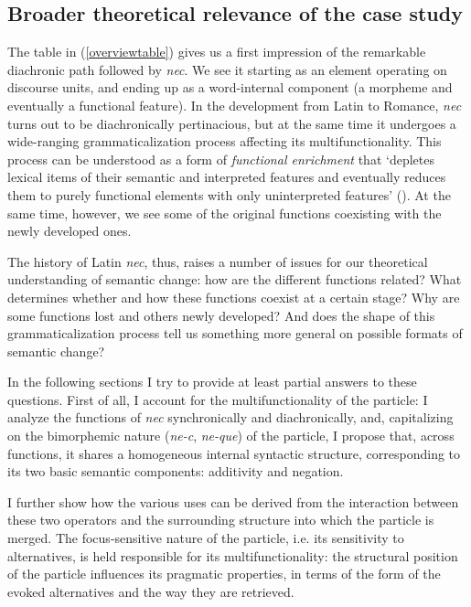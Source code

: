 \documentclass[output=paper,modfonts,nonflat,citecolor=brown,
showindex
]{langsci/langscibook}
\begin{document}
\subsection{Broader theoretical relevance of the case study} \label{theoreticalrelevance}

The table in (\ref{overviewtable}) gives us a first impression of the remarkable diachronic path followed by {\emph{nec}}. We see it starting as an element operating on discourse units, and ending up as a word-internal component (a morpheme and eventually a functional feature). In the development from Latin to Romance, {\emph{nec}} turns out to be diachronically pertinacious, but at the same time it undergoes a wide-ranging grammaticalization process affecting its multifunctionality. This process can be understood as a form of {\emph{functional enrichment}} that `depletes lexical items of their semantic and interpreted features and eventually reduces them to purely functional elements with only uninterpreted features' (\citealt[73]{Kiparsky15}). At the same time, however, we see some of the original functions coexisting with the newly developed ones.  

The history of Latin {\emph{nec}}, thus, raises a number of issues for our theoretical understanding of semantic change: how are the different functions related? What determines whether and how these functions coexist at a certain stage? Why are some functions lost and others newly developed? And does the shape of this grammaticalization process tell us something more general on possible formats of semantic change?

In the following sections I try to provide at least partial answers to these questions. First of all, I account for the multifunctionality of the particle: I analyze the functions of {\emph{nec}} synchronically and diachronically, and, capitalizing on the bimorphemic nature ({\emph{ne-c}}, {\emph{ne-que}}) of the particle, I propose that, across functions, it shares a homogeneous internal syntactic structure, corresponding to its two basic semantic components: additivity and negation. 

I further show how the various uses can be derived from the interaction between these two operators and the surrounding structure into which the particle is merged. The focus-sensitive nature of the particle, i.e. its sensitivity to alternatives, is held responsible for its multifunctionality: the structural position of the particle influences its pragmatic properties, in terms of the form of the evoked alternatives and the way they are retrieved. 
\end{document}
